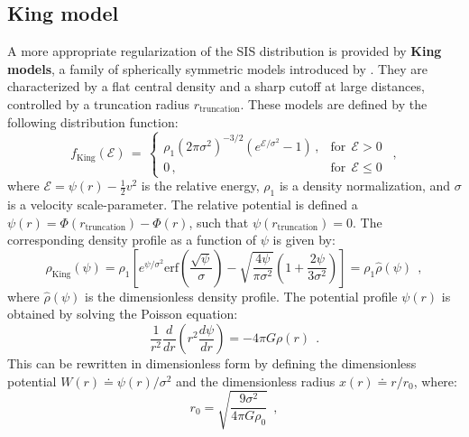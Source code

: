 \documentclass[fleqn,usenatbib]{mnras}
\begin{document}
\subsection{King model}\label{sec:King_model}
A more appropriate regularization of the SIS distribution is provided by \textbf{King models}, a family of spherically symmetric models introduced by \cite{King1966}.
They are characterized by a flat central density and a sharp cutoff at large distances, controlled by a truncation radius $r_\text{truncation}$.
These models are defined by the following distribution function:
\begin{equation}
    f_\text{King}(\mathcal{E}) \, = \, 
    \begin{cases}
      \rho_1 \left(2 \pi \sigma^2\right)^{-3/2} \left(e^{\mathcal{E}/\sigma^2} - 1\right) \, , &\text{for}\:\:\mathcal{E}>0\\
      0 \, , &\text{for}\:\:\mathcal{E} \leq 0
    \end{cases} \:\: ,
    \label{eq:king_distribution_function}
\end{equation}
where $\mathcal{E} = \psi(r) - \frac{1}{2} v^2$ is the relative energy, $\rho_1$ is a density normalization, and $\sigma$ is a velocity scale-parameter.
The relative potential is defined a $\psi(r) = \Phi(r_\text{truncation}) - \Phi(r)$, such that $\psi(r_\text{truncation}) = 0$.
The corresponding density profile as a function of $\psi$ is given by:
{\fontsize{8.1pt}{8.1pt}\begin{equation}
    \rho_\text{King}(\psi) = \rho_1 \left[ e^{\psi/\sigma^2} \text{erf}\left(\dfrac{\sqrt{\psi}}{\sigma}\right) - \sqrt{\dfrac{4 \psi}{\pi \sigma^2}} \left(1+\dfrac{2 \psi}{3 \sigma^2}\right) \right] = \rho_1 \hat{\rho}(\psi) \:\:,
    \label{eq:king_density}
\end{equation}}
where $\hat{\rho}(\psi)$ is the dimensionless density profile.
The potential profile $\psi(r)$ is obtained by solving the Poisson equation:
\begin{equation}
    \dfrac{1}{r^2} \dfrac{d}{dr} \left(r^2 \dfrac{d\psi}{dr}\right) = -4 \pi G \rho(r) \:\: .
    \label{eq:king_poisson}
\end{equation}
This can be rewritten in dimensionless form by defining the dimensionless potential $W(r) \doteq \psi(r)/\sigma^2$ and the dimensionless radius $x(r) \doteq r/r_0$, where:
\begin{equation}
     r_0 = \sqrt{\dfrac{9 \sigma^2}{4 \pi G \rho_0}} \:\:,
    \label{eq:king_r0}
\end{equation}
\end{document}
